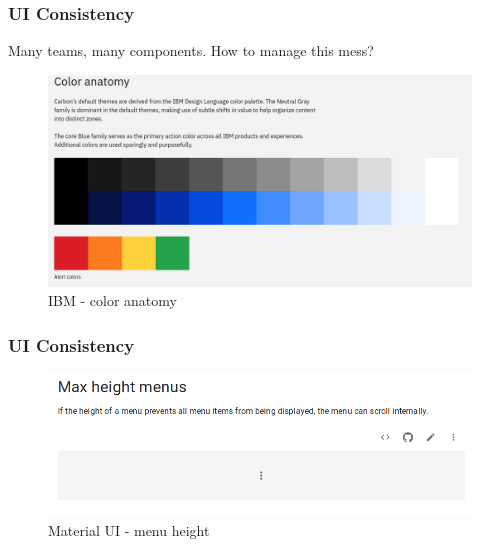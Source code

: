 \begin{frame}
\frametitle{UI Consistency}
Many teams, many components. How to manage this mess?
\pause
\begin{figure}
	\centering
	\includegraphics[width=0.7\linewidth]{pictures/ibm-color}
	\caption{IBM - color anatomy}
	\label{fig:ibm-color}
\end{figure}


\end{frame}


\begin{frame}
\frametitle{UI Consistency}

\begin{figure}
	\centering
	\includegraphics[width=0.7\linewidth]{pictures/design-MATERIAL.png}
	\caption{Material UI - menu height}
	\label{fig:material-UI}
\end{figure}


\end{frame}
